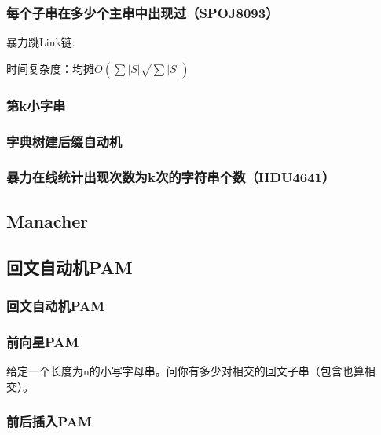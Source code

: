 \documentclass[twoside,a4paper]{article}
\begin{document}
\subsubsection{每个子串在多少个主串中出现过（SPOJ8093）}
暴力跳Link链.\par
时间复杂度：$均摊O(\sum |S|\sqrt{\sum |S|})$


\subsubsection{第k小字串}


\subsubsection{字典树建后缀自动机}


\subsubsection{暴力在线统计出现次数为k次的字符串个数（HDU4641）}



\subsection{Manacher}


\subsection{回文自动机PAM}

\subsubsection{回文自动机PAM}


\subsubsection{前向星PAM}
给定一个长度为n的小写字母串。问你有多少对相交的回文子串（包含也算相交）。


\subsubsection{前后插入PAM}

\end{document}
